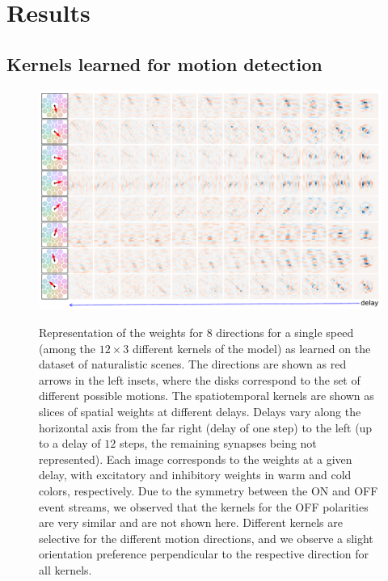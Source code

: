 \documentclass[default]{sn-jnl}%
\theoremstyle{thmstyleone}%
\theoremstyle{thmstyletwo}%
\theoremstyle{thmstylethree}%
\begin{document}
\section{Results}
\label{sec:results}
\subsection{Kernels learned for motion detection}
\begin{figure}[ht!]
    {\centering
    \includegraphics[width=\linewidth]{figures/motion_kernels.pdf}
    }
    \caption{
    	Representation of the weights for $8$ directions for a single speed (among the $12 \times 3$ different kernels of the model) as learned on the dataset of naturalistic scenes. The directions are shown as red arrows in the left insets, where the disks correspond to the set of different possible motions. The spatiotemporal kernels are shown as slices of spatial weights at different delays. Delays vary along the horizontal axis from the far right (delay of one step) to the left (up to a delay of $12$ steps, the remaining synapses being not represented). Each image corresponds to the weights at a given delay, with excitatory and inhibitory weights in warm and cold colors, respectively. Due to the symmetry between the ON and OFF event streams, we observed that the kernels for the OFF polarities are very similar and are not shown here.	Different kernels are selective for the different motion directions, and we observe a slight orientation preference perpendicular to the respective direction for all kernels.
	}
    \label{fig:kernels}
\end{figure} 
\end{document}
